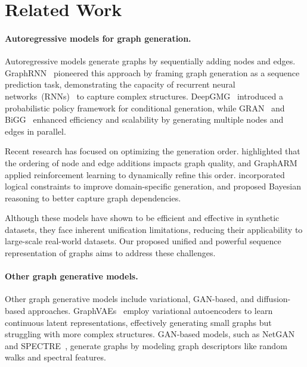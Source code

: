 \section{Related Work}
\paragraph{Autoregressive models for graph generation.}
Autoregressive models generate graphs by sequentially adding nodes and edges. GraphRNN~\citep{you2018graphrnn} pioneered this approach by framing graph generation as a sequence prediction task, demonstrating the capacity of recurrent neural networks~(RNNs)~\citep{chung2014empirical} to capture complex structures. DeepGMG~\citep{li2018learning} introduced a probabilistic policy framework for conditional generation, while GRAN~\citep{liao2019efficient} and BiGG~\citep{dai2020bigg} enhanced efficiency and scalability by generating multiple nodes and edges in parallel.

Recent research has focused on optimizing the generation order. \citet{chen2021order} highlighted that the ordering of node and edge additions impacts graph quality, and GraphARM~\citep{kong2023autoregressive} applied reinforcement learning to dynamically refine this order. \citet{goyal2020graphgen} incorporated logical constraints to improve domain-specific generation, and \citet{bacciu2020edge} proposed Bayesian reasoning to better capture graph dependencies.

Although these models have shown to be efficient and effective in synthetic datasets, they face inherent unification limitations, reducing their applicability to large-scale real-world datasets. Our proposed unified and powerful sequence representation of graphs aims to address these challenges.

\vspace{-.1in}
\paragraph{Other graph generative models.}

Other graph generative models include variational, GAN-based, and diffusion-based approaches. GraphVAEs~\citep{kipf2016variational,simonovsky2018graphvae} employ variational autoencoders to learn continuous latent representations, effectively generating small graphs but struggling with more complex structures. GAN-based models, such as NetGAN~\citep{bojchevski2018netgan} and SPECTRE~\citep{martinkus2022spectre}, generate graphs by modeling graph descriptors like random walks and spectral features.

